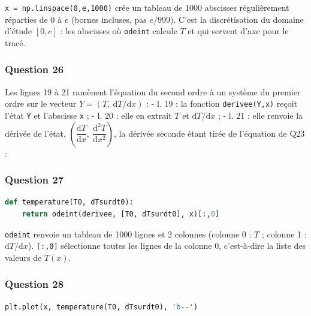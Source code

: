 \documentclass[11pt,a4paper]{article}
\newcommand{\equationajustee}[1]{%
  \sbox{\boiteequation}{$\displaystyle #1$}%
  \ifdim\wd\boiteequation>\linewidth
    \[\resizebox{\linewidth}{!}{\usebox{\boiteequation}}\]%
  \else
    \[#1\]%
  \fi}
\begin{document}
\texttt{x\ =\allowbreak{}\ np.linspace(\allowbreak{}0,\allowbreak{}e,\allowbreak{}1000)\allowbreak{}} crée un tableau de 1000 abscisses régulièrement réparties de 0 à \(e\) (bornes incluses, pas \(e/999\)). C'est la discrétisation du domaine d'étude \([0,e]\) : les abscisses où \texttt{odeint} calcule \(T\) et qui servent d'axe pour le tracé.

\hypertarget{question-26}{%
\subsubsection{Question 26}\label{question-26}}

Les lignes 19 à 21 ramènent l'équation du second ordre à un système du premier ordre sur le vecteur \(Y=(T,\ \mathrm dT/\mathrm dx)\) :
- l. 19 : la fonction \texttt{derivee(Y,x)} reçoit l'état \texttt{Y} et l'abscisse \texttt{x} ;
- l. 20 : elle en extrait \(T\) et \(\mathrm dT/\mathrm dx\) ;
- l. 21 : elle renvoie la dérivée de l'état, \(\left(\dfrac{\mathrm dT}{\mathrm dx},\allowbreak \ \dfrac{\mathrm d^2T}{\mathrm dx^2}\right)\), la dérivée seconde étant tirée de l'équation de Q23 :

\equationajustee{\frac{\mathrm d^2T}{\mathrm dx^2}=-\frac{\mathcal P}{2eS\lambda}}

\hypertarget{question-27}{%
\subsubsection{Question 27}\label{question-27}}

\begin{lstlisting}[language=Python]
def temperature(T0, dTsurdt0):
    return odeint(derivee, [T0, dTsurdt0], x)[:,0]
\end{lstlisting}

\texttt{odeint} renvoie un tableau de 1000 lignes et 2 colonnes (colonne 0 : \(T\) ; colonne 1 : \(\mathrm dT/\mathrm dx\)). \texttt{{[}:,0{]}} sélectionne toutes les lignes de la colonne 0, c'est-à-dire la liste des valeurs de \(T(x)\).

\hypertarget{question-28}{%
\subsubsection{Question 28}\label{question-28}}

\begin{lstlisting}[language=Python]
plt.plot(x, temperature(T0, dTsurdt0), 'b--')
\end{lstlisting}
\end{document}
